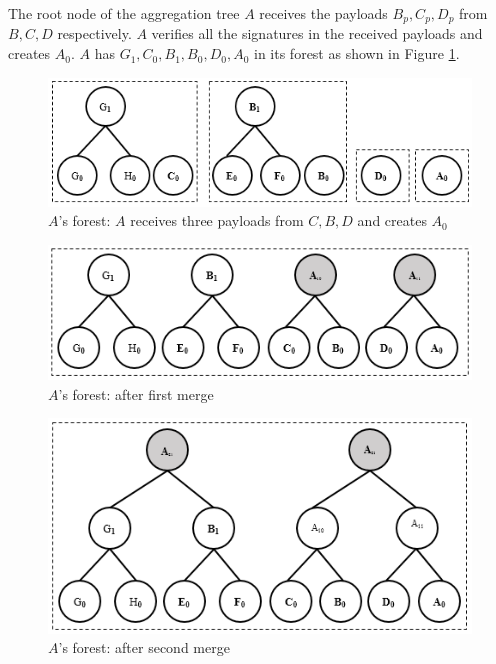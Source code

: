 		The root node of the aggregation tree $A$ receives the payloads $B_{p}, C_{p}, D_{p}$
		from $B,C,D$ respectively.
		$A$ verifies all the signatures in the received payloads and creates $A_{0}$.
		$A$ has $G_{1},C_{0},B_{1},B_{0},D_{0},A_{0}$ in its forest as shown in Figure \ref{fig:a-forest}.
		\begin{figure}[h!]
			\centering
			\includegraphics{images/a-forest.png}
			\caption{$A$'s forest: $A$ receives three payloads from $C,B,D$ and creates $A_{0}$}
			\label{fig:a-forest}
		\end{figure}
		\begin{figure}[h!]
			\centering
			\includegraphics{images/a-forest-first-merge.png}
			\caption{$A$'s forest: after first merge}
			\label{fig:a-forest-first-merge}
		\end{figure}
		\begin{figure}[h!]
			\centering
			\includegraphics{images/a-forest-second-merge.png}
			\caption{$A$'s forest: after second merge}
			\label{fig:a-forest-second-merge}
		\end{figure}
